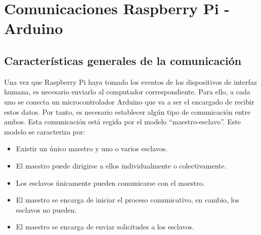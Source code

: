 










\newpage
\section{Comunicaciones Raspberry Pi - Arduino} \label{s2_3}

\subsection{Características generales de la comunicación} \label{s2_3_1}

Una vez que Raspberry Pi haya tomado los eventos de los dispositivos de interfaz humana, es necesario enviarlo al computador correspondiente. Para ello, a cada uno se conecta un microcontrolador Arduino que va a ser el encargado de recibir estos datos. Por tanto, es necesario establecer algún tipo de comunicación entre ambos. Esta comunicación está regida por el modelo ``maestro-esclavo''. Este modelo se caracteriza por:

\begin{itemize}
    \item Existir un único maestro y uno o varios esclavos.
    \item El maestro puede dirigirse a ellos individualmente o colectivamente.
    \item Los esclavos únicamente pueden comunicarse con el maestro.
    \item El maestro se encarga de iniciar el proceso comunicativo, en cambio, los esclavos no pueden.
    \item El maestro se encarga de enviar solicitudes a los esclavos.
\end{itemize}

